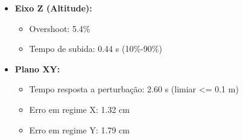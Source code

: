 \begin{itemize}
  \item \textbf{Eixo Z (Altitude):}
  \begin{itemize}
    \item Overshoot: 5.4\%
    \item Tempo de subida: 0.44 s (10\%-90\%)
  \end{itemize}
  \item \textbf{Plano XY:}
  \begin{itemize}
    \item Tempo resposta a perturbação: 2.60 s (limiar <= 0.1 m)
    \item Erro em regime X: 1.32 cm
    \item Erro em regime Y: 1.79 cm
  \end{itemize}
\end{itemize}
